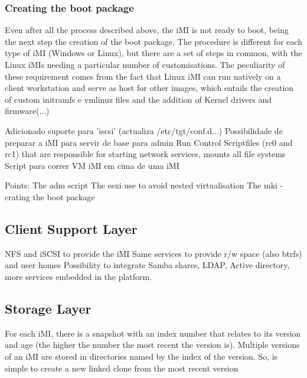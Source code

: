 \subsubsection{Creating the boot package}
\label{subsub:createboot_imi}

Even after all the process described above, the iMI is not ready to boot, being the next step the creation of the boot package.
The procedure is different for each type of iMI (Windows or Linux), but there are a set of steps in common, with the Linux iMIs needing a particular number of customisations. The peculiarity of these requirement comes from the fact that Linux iMI can run natively on a client workstation and serve as host for other images, which entails the creation of custom initramfs e vmlinuz files and the addition of Kernel drivers and firmware(...)

Adicionado suporte para 'iscsi' (actualiza /etc/tgt/conf.d...)
Possibilidade de preparar a iMI para servir de base para admin
Run Control Scriptfiles (rc0 and rc1) that are responsible for starting network services, mounts all file systems
Script para correr VM iMI em cima de uma iMI


Points:
The adm script
The esxi use to avoid nested virtualisation
The mki - crating the boot package


\subsection{Client Support Layer}
\label{sub:icbd_architecture_client}

NFS and iSCSI to provide the iMI
Same services to provide r/w space (also btrfs) and user homes
Possibility to integrate Samba shares, LDAP, Active directory, more services embedded in the platform.

\subsection{Storage Layer}
\label{sub:icbd_architecture_storage}

For each iMI, there is a snapshot with an index number that relates to its version and age (the higher the number the most recent the version is).
Multiple versions of an iMI are stored in directories named by the index of the version. So, is simple to create a new linked clone from the most recent version 

